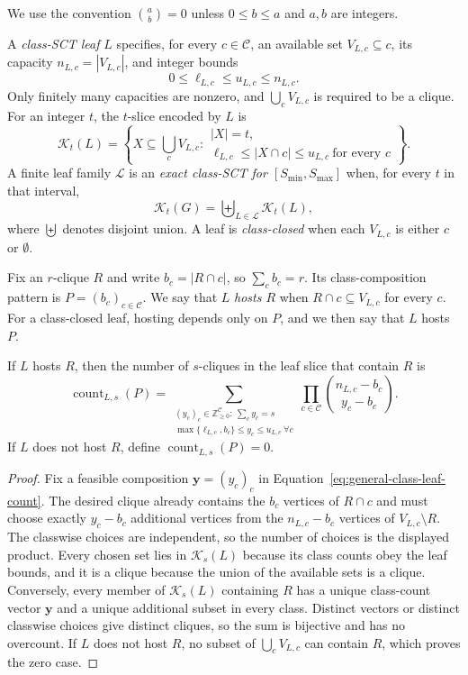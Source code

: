 We use the convention $\binom ab=0$ unless $0\leq b\leq a$ and $a,b$ are integers.

\begin{definition}
\label{def:class-sct-leaf}
A \emph{class-SCT leaf} $L$ specifies, for every $c\in\mathcal C$, an available set $V_{L,c}\subseteq c$, its capacity $n_{L,c}=|V_{L,c}|$, and integer bounds
\[
0\leq \ell_{L,c}\leq u_{L,c}\leq n_{L,c}.
\]
Only finitely many capacities are nonzero, and $\bigcup_cV_{L,c}$ is required to be a clique.
%
For an integer $t$, the $t$-slice encoded by $L$ is
\[
\mathcal K_t(L)=
\left\{
X\subseteq\bigcup_cV_{L,c}:
\substack{
|X|=t,\\
\ell_{L,c}\leq |X\cap c|\leq u_{L,c}\ \text{for every }c}
\right\}.
\]
A finite leaf family $\mathcal L$ is an \emph{exact class-SCT for $[S_{\min},S_{\max}]$} when, for every $t$ in that interval,
\[
\mathcal K_t(G)=\biguplus_{L\in\mathcal L}\mathcal K_t(L),
\]
where $\biguplus$ denotes disjoint union.
%
A leaf is \emph{class-closed} when each $V_{L,c}$ is either $c$ or $\emptyset$.
\end{definition}

Fix an $r$-clique $R$ and write $b_c=|R\cap c|$, so $\sum_cb_c=r$.
%
Its class-composition pattern is $P=(b_c)_{c\in\mathcal C}$.
%
We say that $L$ \emph{hosts $R$} when $R\cap c\subseteq V_{L,c}$ for every $c$.
%
For a class-closed leaf, hosting depends only on $P$, and we then say that $L$ hosts $P$.

\begin{lemma}
\label{lem:general-class-leaf-count}
If $L$ hosts $R$, then the number of $s$-cliques in the leaf slice that contain $R$ is
\begin{equation}
\label{eq:general-class-leaf-count}
\operatorname{count}_{L,s}(P)
=
\sum_{\substack{
(y_c)_c\in\mathbb Z_{\geq0}^{\mathcal C}:\ \sum_cy_c=s\\
\max\{\ell_{L,c},b_c\}\leq y_c\leq u_{L,c}\ \forall c}}
\prod_{c\in\mathcal C}
\binom{n_{L,c}-b_c}{y_c-b_c}.
\end{equation}
If $L$ does not host $R$, define $\operatorname{count}_{L,s}(P)=0$.
\end{lemma}
\begin{proof}
Fix a feasible composition $\mathbf y=(y_c)_c$ in Equation~\eqref{eq:general-class-leaf-count}.
%
The desired clique already contains the $b_c$ vertices of $R\cap c$ and must choose exactly $y_c-b_c$ additional vertices from the $n_{L,c}-b_c$ vertices of $V_{L,c}\setminus R$.
%
The classwise choices are independent, so the number of choices is the displayed product.
%
Every chosen set lies in $\mathcal K_s(L)$ because its class counts obey the leaf bounds, and it is a clique because the union of the available sets is a clique.
%
Conversely, every member of $\mathcal K_s(L)$ containing $R$ has a unique class-count vector $\mathbf y$ and a unique additional subset in every class.
%
Distinct vectors or distinct classwise choices give distinct cliques, so the sum is bijective and has no overcount.
%
If $L$ does not host $R$, no subset of $\bigcup_cV_{L,c}$ can contain $R$, which proves the zero case.
\end{proof}

